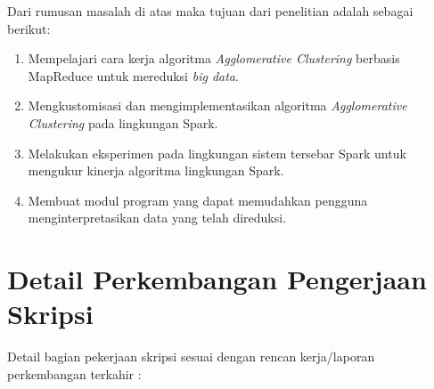 \documentclass[a4paper,twoside]{article}
\begin{document}
Dari rumusan masalah di atas maka tujuan dari penelitian adalah sebagai berikut:
\begin{enumerate}

\item Mempelajari cara kerja algoritma  {\it Agglomerative Clustering} berbasis MapReduce untuk mereduksi {\it big data}.

\item Mengkustomisasi dan mengimplementasikan algoritma {\it Agglomerative Clustering} pada lingkungan Spark.

\item Melakukan eksperimen pada lingkungan sistem tersebar Spark untuk mengukur kinerja algoritma lingkungan Spark.

\item Membuat modul program yang dapat memudahkan pengguna menginterpretasikan data yang telah direduksi.

\end{enumerate}




\section{Detail Perkembangan Pengerjaan Skripsi}

Detail bagian pekerjaan skripsi sesuai dengan rencan kerja/laporan perkembangan terkahir :
\end{document}

